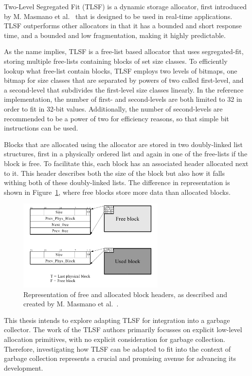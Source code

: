 
Two-Level Segregated Fit (TLSF) is a dynamic storage allocator, first introduced by M. Masmano et al.~\cite{TLSF} that is designed to be used in real-time applications. TLSF outperforms other allocators in that it has a bounded and short response time, and a bounded and low fragmentation, making it highly predictable.

As the name implies, TLSF is a free-list based allocator that uses segregated-fit, storing multiple free-lists containing blocks of set size classes. To efficiently lookup what free-list contain blocks, TLSF employs two levels of bitmaps, one bitmap for size classes that are separated by powers of two called first-level, and a second-level that subdivides the first-level size classes linearly. In the reference implementation, the number of first- and second-levels are both limited to 32 in order to fit in 32-bit values. Additionally, the number of second-levels are recommended to be a power of two for efficiency reasons, so that simple bit instructions can be used.

Blocks that are allocated using the allocator are stored in two doubly-linked list structures, first in a physically ordered list and again in one of the free-lists if the block is free. To facilitate this, each block has an associated header allocated next to it. This header describes both the size of the block but also how it falls withing both of these doubly-linked lists. The difference in representation is shown in Figure~\ref{fig:blockheader_reference}, where free blocks store more data than allocated blocks.

\begin{figure}[H]
    \centering
    \includegraphics[width=0.65\textwidth]{figures/blockheader_reference.png}
    \caption{Representation of free and allocated block headers, as described and created by M. Masmano et al.~\cite{TLSF}.}
    \label{fig:blockheader_reference}
\end{figure}

This thesis intends to explore adapting TLSF for integration into a garbage collector. The work of the TLSF authors primarily focusses on explicit low-level allocation primitives, with no explicit consideration for garbage collection. Therefore, investigating how TLSF can be adapted to fit into the context of garbage collection represents a crucial and promising avenue for advancing its development.

